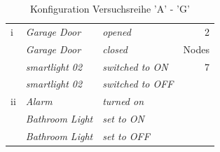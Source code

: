 \begin{table}[!ht]
{\begin{tabular}{llll}
i             & \textit{Garage Door}          & \textit{opened}                           & \multicolumn{1}{r}{2}     \\
              & \textit{Garage Door}          & \textit{closed}                           & Nodes                     \\
              & \textit{smartlight 02}        & \textit{switched to ON}                   & \multicolumn{1}{r}{7}     \\
              & \textit{smartlight 02}        & \textit{switched to OFF}                  &                           \\
ii            & \textit{Alarm}                & \textit{turned on}                        &                           \\
              & \textit{Bathroom Light}       & \textit{set to ON}                        &                           \\
              & \textit{Bathroom Light}       & \textit{set to OFF}                       &                           \\ \hline

\end{tabular}%
}
\caption{Konfiguration Versuchsreihe 'A' - 'G'}
\label{tab:Versuchskonfig1}
\end{table}


